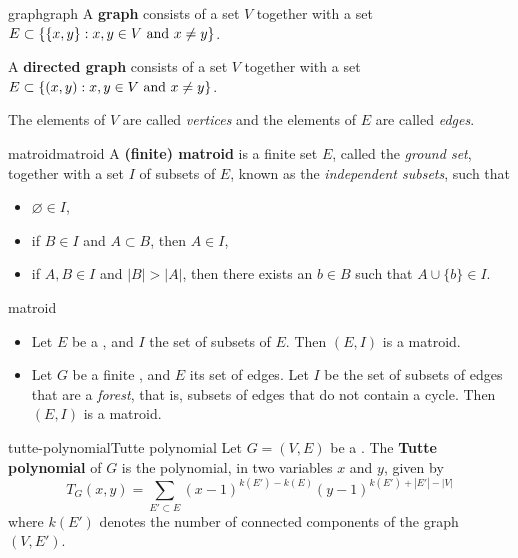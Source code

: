 \begin{topic}{graph}{graph}
    A \textbf{graph} consists of a set $V$ together with a set $E \subset \{ \{ x, y \} : x, y \in V \textup{ and } x \ne y \}$.
    
    A \textbf{directed graph} consists of a set $V$ together with a set $E \subset \{ (x, y) : x, y \in V \textup{ and } x \ne y \}$.
    
    The elements of $V$ are called \textit{vertices} and the elements of $E$ are called \textit{edges}.
\end{topic}

\begin{topic}{matroid}{matroid}
    A \textbf{(finite) matroid} is a finite set $E$, called the \textit{ground set}, together with a set $I$ of subsets of $E$, known as the \textit{independent subsets}, such that
    \begin{itemize}
        \item $\varnothing \in I$,
        \item if $B \in I$ and $A \subset B$, then $A \in I$,
        \item if $A, B \in I$ and $|B| > |A|$, then there exists an $b \in B$ such that $A \cup \{ b \} \in I$.
    \end{itemize}
\end{topic}

\begin{example}{matroid}
    \begin{itemize}
        \item Let $E$ be a , and $I$ the set of  subsets of $E$. Then $(E, I)$ is a matroid.
        \item Let $G$ be a finite , and $E$ its set of edges. Let $I$ be the set of subsets of edges that are a \textit{forest}, that is, subsets of edges that do not contain a cycle. Then $(E, I)$ is a matroid.
    \end{itemize}
\end{example}

\begin{topic}{tutte-polynomial}{Tutte polynomial}
    Let $G = (V, E)$ be a . The \textbf{Tutte polynomial} of $G$ is the polynomial, in two variables $x$ and $y$, given by
    \[ T_G(x, y) = \sum_{E' \subset E} (x - 1)^{k(E') - k(E)} (y - 1)^{k(E') + |E'| - |V|} \]
    where $k(E')$ denotes the number of connected components of the graph $(V, E')$.
\end{topic}
